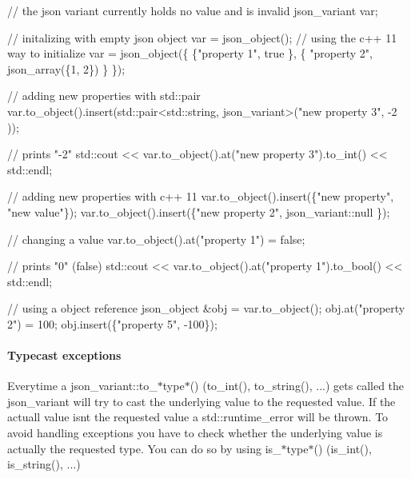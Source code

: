 \begin{DoxyCode}
\textcolor{comment}{// the json variant currently holds no value and is invalid}
json\_variant var; 

\textcolor{comment}{// initalizing with empty json object}
var = json\_object();
\textcolor{comment}{// using the c++ 11 way to initialize}
var = json\_object(\{ \{\textcolor{stringliteral}{"property 1"}, \textcolor{keyword}{true} \}, \{ \textcolor{stringliteral}{"property 2"}, json\_array(\{1, 2\}) \} \}); 

\textcolor{comment}{// adding new properties with std::pair}
var.to\_object().insert(std::pair<std::string, json\_variant>(\textcolor{stringliteral}{"new property 3"}, -2 ));

\textcolor{comment}{// prints "-2"}
std::cout << var.to\_object().at(\textcolor{stringliteral}{"new property 3"}).to\_int() << std::endl; 

\textcolor{comment}{// adding new properties with c++ 11}
var.to\_object().insert(\{\textcolor{stringliteral}{"new property"}, \textcolor{stringliteral}{"new value"}\});
var.to\_object().insert(\{\textcolor{stringliteral}{"new property 2"}, json\_variant::null \});

\textcolor{comment}{// changing a value}
var.to\_object().at(\textcolor{stringliteral}{"property 1"}) = \textcolor{keyword}{false};

\textcolor{comment}{// prints "0" (false)}
std::cout << var.to\_object().at(\textcolor{stringliteral}{"property 1"}).to\_bool() << std::endl; 

\textcolor{comment}{// using a object reference}
json\_object &obj = var.to\_object();
obj.at(\textcolor{stringliteral}{"property 2"}) = 100;
obj.insert(\{\textcolor{stringliteral}{"property 5"}, -100\});
\end{DoxyCode}


\paragraph*{\label{_typecast_exceptions_section}%
Typecast exceptions}

Everytime a {\ttfamily json\+\_\+variant\+::to\+\_\+$\ast$type$\ast$()} ({\ttfamily to\+\_\+int()}, {\ttfamily to\+\_\+string()}, ...) gets called the json\+\_\+variant will try to cast the underlying value to the requested value. If the actuall value isn\textquotesingle{}t the requested value a {\ttfamily std\+::runtime\+\_\+error} will be thrown. To avoid handling exceptions you have to check whether the underlying value is actually the requested type. You can do so by using {\ttfamily is\+\_\+$\ast$type$\ast$()} ({\ttfamily is\+\_\+int()}, {\ttfamily is\+\_\+string()}, ...)


